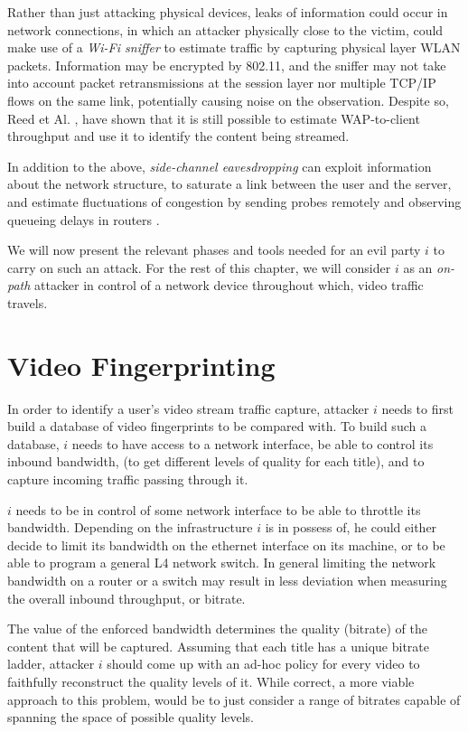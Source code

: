 Rather than just attacking physical devices, leaks of information could occur
in network connections, in which an attacker physically close to the victim,
could make use of a \emph{Wi-Fi sniffer} to estimate traffic by capturing
physical layer WLAN packets.  Information may be encrypted by 802.11, and the
sniffer may not take into account packet retransmissions at the session layer
nor multiple TCP/IP flows on the same link, potentially causing noise on the
observation. Despite so, Reed et Al. \cite{leaky_streams}, have shown that it
is still possible to estimate WAP-to-client throughput and use it to identify
the content being streamed.

In addition to the above, \emph{side-channel eavesdropping} can exploit
information about the network structure, to saturate a link between the user
and the server, and estimate fluctuations of congestion by sending probes
remotely and observing queueing delays in routers \cite{side_channel}. 

We will now present the relevant phases and tools needed for an evil party $i$
to carry on such an attack. For the rest of this chapter, we will consider $i$
as an \emph{on-path} attacker in control of a network device throughout which,
video traffic travels.

\section{Video Fingerprinting}

In order to identify a user's video stream traffic capture, attacker $i$ needs
to first build a database of video fingerprints to be compared with. To build
such a database, $i$ needs to have access to a network interface, be able to
control its inbound bandwidth, (to get different levels of quality for each
title), and to capture incoming traffic passing through it.

$i$ needs to be in control of some network interface to be able to throttle its
bandwidth. Depending on the infrastructure $i$ is in possess of, he could
either decide to limit its bandwidth on the ethernet interface on its machine,
or to be able to program a general L4 network switch. In general limiting the
network bandwidth on a router or a switch may result in less deviation when
measuring the overall  inbound throughput, or bitrate.

The value of the enforced bandwidth determines the quality (bitrate) of the
content that will be captured. Assuming that each title has a unique bitrate
ladder, attacker $i$ should come up with an ad-hoc policy for every video to
faithfully reconstruct the quality levels of it. While correct, a more viable
approach to this problem, would be to just consider a range of bitrates capable
of spanning the space of possible quality levels. 


